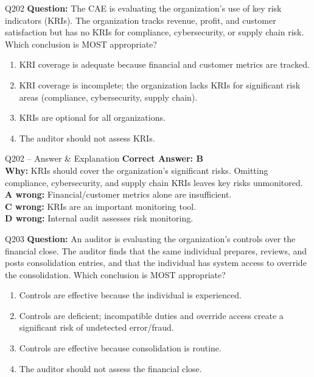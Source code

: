 \documentclass[aspectratio=169,10pt]{beamer}
\begin{document}
	\begin{frame}[t]{Q202}
		\small
		\textbf{Question:} The CAE is evaluating the organization's use of key risk indicators (KRIs). The organization tracks revenue, profit, and customer satisfaction but has no KRIs for compliance, cybersecurity, or supply chain risk. Which conclusion is MOST appropriate?
		\begin{enumerate}[label=\Alph*.,itemsep=1pt,topsep=2pt]
			\item KRI coverage is adequate because financial and customer metrics are tracked.
			\item KRI coverage is incomplete; the organization lacks KRIs for significant risk areas (compliance, cybersecurity, supply chain).
			\item KRIs are optional for all organizations.
			\item The auditor should not assess KRIs.
		\end{enumerate}
	\end{frame}
	
	\begin{frame}[t]{Q202 -- Answer \& Explanation}
		\small
		\textbf{Correct Answer: B} \\[4pt]
		\textbf{Why:} KRIs should cover the organization's significant risks. Omitting compliance, cybersecurity, and supply chain KRIs leaves key risks unmonitored. \\[4pt]
		\textbf{A wrong:} Financial/customer metrics alone are insufficient. \\[2pt]
		\textbf{C wrong:} KRIs are an important monitoring tool. \\[2pt]
		\textbf{D wrong:} Internal audit assesses risk monitoring.
	\end{frame}
	
	\begin{frame}[t]{Q203}
		\small
		\textbf{Question:} An auditor is evaluating the organization's controls over the financial close. The auditor finds that the same individual prepares, reviews, and posts consolidation entries, and that the individual has system access to override the consolidation. Which conclusion is MOST appropriate?
		\begin{enumerate}[label=\Alph*.,itemsep=1pt,topsep=2pt]
			\item Controls are effective because the individual is experienced.
			\item Controls are deficient; incompatible duties and override access create a significant risk of undetected error/fraud.
			\item Controls are effective because consolidation is routine.
			\item The auditor should not assess the financial close.
		\end{enumerate}
	\end{frame}
	
\end{document}
